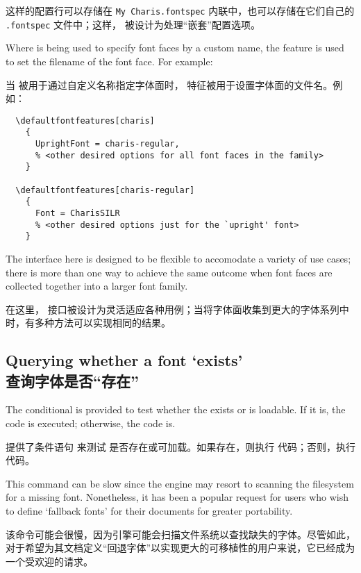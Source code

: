 \documentclass[a4paper]{l3doc}
\begin{document}
这样的配置行可以存储在 \texttt{My Charis.fontspec} 内联中，也可以存储在它们自己的 \texttt{.fontspec} 文件中；这样， 被设计为处理“嵌套”配置选项。

Where  is being used to specify font faces by a custom name,
the  feature is used to set the filename of the font face. For example:

当  被用于通过自定义名称指定字体面时， 特征被用于设置字体面的文件名。例如：

\begin{Verbatim}
  \defaultfontfeatures[charis]
    {
      UprightFont = charis-regular,
      % <other desired options for all font faces in the family>
    }

  \defaultfontfeatures[charis-regular]
    {
      Font = CharisSILR
      % <other desired options just for the `upright' font>
    }
\end{Verbatim}
The  interface here is designed to be flexible to accomodate a variety
of use cases; there is more than one way to achieve the same outcome when font faces are
collected together into a larger font family.

在这里， 接口被设计为灵活适应各种用例；当将字体面收集到更大的字体系列中时，有多种方法可以实现相同的结果。


\subsection{Querying whether a font `exists'\\查询字体是否“存在”}


The conditional  is provided to test whether the  exists or is loadable.
If it is, the  code is executed; otherwise, the  code is.

提供了条件语句  来测试  是否存在或可加载。如果存在，则执行  代码；否则，执行  代码。


This command can be slow since the engine may resort to scanning the filesystem for a missing font.
Nonetheless, it has been a popular request for users who wish to define `fallback fonts' for their documents for greater portability.

该命令可能会很慢，因为引擎可能会扫描文件系统以查找缺失的字体。尽管如此，对于希望为其文档定义“回退字体”以实现更大的可移植性的用户来说，它已经成为一个受欢迎的请求。
\end{document}
